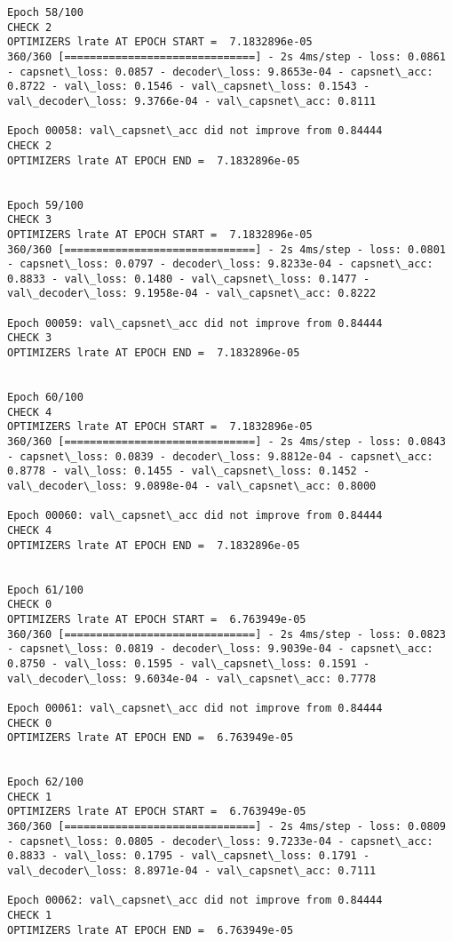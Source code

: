 \documentclass[11pt]{article}
\begin{document}
\begin{Verbatim}[commandchars=\\\{\}]
Epoch 58/100
CHECK 2
OPTIMIZERS lrate AT EPOCH START =  7.1832896e-05
360/360 [==============================] - 2s 4ms/step - loss: 0.0861 - capsnet\_loss: 0.0857 - decoder\_loss: 9.8653e-04 - capsnet\_acc: 0.8722 - val\_loss: 0.1546 - val\_capsnet\_loss: 0.1543 - val\_decoder\_loss: 9.3766e-04 - val\_capsnet\_acc: 0.8111

Epoch 00058: val\_capsnet\_acc did not improve from 0.84444
CHECK 2
OPTIMIZERS lrate AT EPOCH END =  7.1832896e-05 


Epoch 59/100
CHECK 3
OPTIMIZERS lrate AT EPOCH START =  7.1832896e-05
360/360 [==============================] - 2s 4ms/step - loss: 0.0801 - capsnet\_loss: 0.0797 - decoder\_loss: 9.8233e-04 - capsnet\_acc: 0.8833 - val\_loss: 0.1480 - val\_capsnet\_loss: 0.1477 - val\_decoder\_loss: 9.1958e-04 - val\_capsnet\_acc: 0.8222

Epoch 00059: val\_capsnet\_acc did not improve from 0.84444
CHECK 3
OPTIMIZERS lrate AT EPOCH END =  7.1832896e-05 


Epoch 60/100
CHECK 4
OPTIMIZERS lrate AT EPOCH START =  7.1832896e-05
360/360 [==============================] - 2s 4ms/step - loss: 0.0843 - capsnet\_loss: 0.0839 - decoder\_loss: 9.8812e-04 - capsnet\_acc: 0.8778 - val\_loss: 0.1455 - val\_capsnet\_loss: 0.1452 - val\_decoder\_loss: 9.0898e-04 - val\_capsnet\_acc: 0.8000

Epoch 00060: val\_capsnet\_acc did not improve from 0.84444
CHECK 4
OPTIMIZERS lrate AT EPOCH END =  7.1832896e-05 


Epoch 61/100
CHECK 0
OPTIMIZERS lrate AT EPOCH START =  6.763949e-05
360/360 [==============================] - 2s 4ms/step - loss: 0.0823 - capsnet\_loss: 0.0819 - decoder\_loss: 9.9039e-04 - capsnet\_acc: 0.8750 - val\_loss: 0.1595 - val\_capsnet\_loss: 0.1591 - val\_decoder\_loss: 9.6034e-04 - val\_capsnet\_acc: 0.7778

Epoch 00061: val\_capsnet\_acc did not improve from 0.84444
CHECK 0
OPTIMIZERS lrate AT EPOCH END =  6.763949e-05 


Epoch 62/100
CHECK 1
OPTIMIZERS lrate AT EPOCH START =  6.763949e-05
360/360 [==============================] - 2s 4ms/step - loss: 0.0809 - capsnet\_loss: 0.0805 - decoder\_loss: 9.7233e-04 - capsnet\_acc: 0.8833 - val\_loss: 0.1795 - val\_capsnet\_loss: 0.1791 - val\_decoder\_loss: 8.8971e-04 - val\_capsnet\_acc: 0.7111

Epoch 00062: val\_capsnet\_acc did not improve from 0.84444
CHECK 1
OPTIMIZERS lrate AT EPOCH END =  6.763949e-05 



\end{Verbatim}
\end{document}
